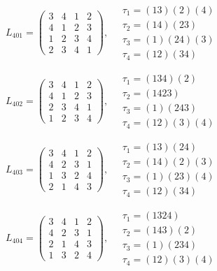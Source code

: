 $L_{401} = \begin{pmatrix} 3 & 4 & 1 & 2 \\ 4 & 1 & 2 & 3 \\ 1 & 2 & 3 & 4 \\ 2 & 3 & 4 & 1 \end{pmatrix}, \quad \begin{matrix} \tau_{1} = (1 3)(2)(4) \\ \tau_{2} = (1 4)(2 3) \\ \tau_{3} = (1)(2 4)(3) \\ \tau_{4} = (1 2)(3 4) \end{matrix}$

$L_{402} = \begin{pmatrix} 3 & 4 & 1 & 2 \\ 4 & 1 & 2 & 3 \\ 2 & 3 & 4 & 1 \\ 1 & 2 & 3 & 4 \end{pmatrix}, \quad \begin{matrix} \tau_{1} = (1 3 4)(2) \\ \tau_{2} = (1 4 2 3) \\ \tau_{3} = (1)(2 4 3) \\ \tau_{4} = (1 2)(3)(4) \end{matrix}$

$L_{403} = \begin{pmatrix} 3 & 4 & 1 & 2 \\ 4 & 2 & 3 & 1 \\ 1 & 3 & 2 & 4 \\ 2 & 1 & 4 & 3 \end{pmatrix}, \quad \begin{matrix} \tau_{1} = (1 3)(2 4) \\ \tau_{2} = (1 4)(2)(3) \\ \tau_{3} = (1)(2 3)(4) \\ \tau_{4} = (1 2)(3 4) \end{matrix}$

$L_{404} = \begin{pmatrix} 3 & 4 & 1 & 2 \\ 4 & 2 & 3 & 1 \\ 2 & 1 & 4 & 3 \\ 1 & 3 & 2 & 4 \end{pmatrix}, \quad \begin{matrix} \tau_{1} = (1 3 2 4) \\ \tau_{2} = (1 4 3)(2) \\ \tau_{3} = (1)(2 3 4) \\ \tau_{4} = (1 2)(3)(4) \end{matrix}$

